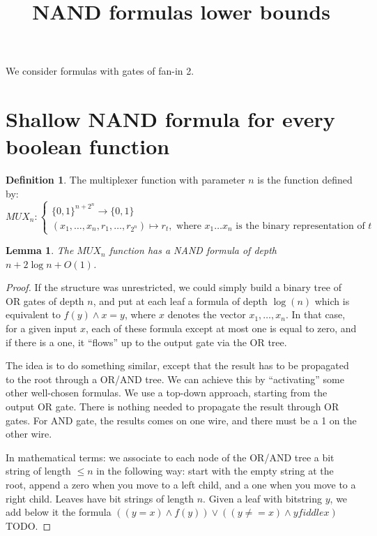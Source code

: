 \documentclass{article}
\title{NAND formulas lower bounds}
\newcommand{\bit}{\{0,1\}}%
\theoremstyle{plain}
\newtheorem{lemma}[theorem]{Lemma}
\theoremstyle{definition}
\newtheorem{definition}[theorem]{Definition}
\begin{document}
\maketitle

We consider formulas with gates of fan-in 2.

\section{Shallow NAND formula for every boolean function}

\begin{definition}
	The multiplexer function with parameter $n$ is
	the function defined by:
	\[MUX_{n}: \begin{cases}
	\bit^{n+2^n} \rightarrow \bit \\
	(x_1,\ldots,x_n, r_1,\ldots, r_{2^n}) \mapsto r_t, \text{ where } x_1\ldots x_n \text{ is the binary representation of } t
	\end{cases}
	\]
\end{definition}

\begin{lemma}\label{lemma:shallow-mux}
	The $MUX_{n}$ function has a NAND formula of depth $n + 2\log n + O(1)$.
\end{lemma}
\begin{proof}
	If the structure was unrestricted, we could simply build a binary tree of OR gates of depth $n$,
	and put at each leaf a formula of depth $\log(n)$ which is equivalent to $f(y) \wedge x = y$,
	where $x$ denotes the vector $x_1,\ldots,x_n$. In that case, for a given input $x$, each of these formula except at most one is equal to zero, and if there is a one, it ``flows'' up to the output gate via the OR tree.

	The idea is to do something similar, except that the result has to be propagated to the root through a OR/AND tree. We can achieve this by ``activating'' some other well-chosen formulas.
	We use a top-down approach, starting from the output OR gate. There is nothing needed to propagate the result through OR gates. For AND gate, the results comes on one wire, and there must be a 1 on the other wire.

	In mathematical terms: we associate to each node of the OR/AND tree a bit string of length $\leq n$ 
	in the following way: 
	start with the empty string at the root, append a zero when you move to a left child, and a one when you move to a right child. Leaves have bit strings of length $n$.
	Given a leaf with bitstring $y$, we add below it the formula 
	$((y = x) \wedge f(y)) \vee ((y\neq= x) \wedge y fiddle x)$ TODO.
\end{proof}
\end{document}

